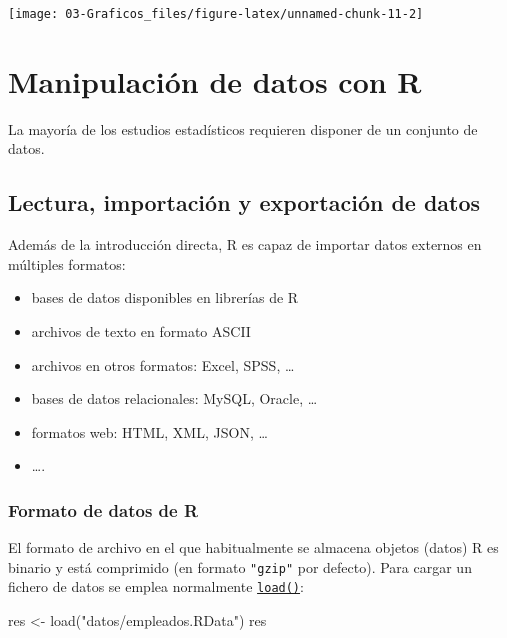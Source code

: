 \documentclass[
]{book}
\newenvironment{Shaded}{\begin{snugshade}}{\end{snugshade}}
\newcommand{\FunctionTok}[1]{\textcolor[rgb]{0.00,0.00,0.00}{#1}}
\newcommand{\NormalTok}[1]{#1}
\newcommand{\OtherTok}[1]{\textcolor[rgb]{0.56,0.35,0.01}{#1}}
\newcommand{\StringTok}[1]{\textcolor[rgb]{0.31,0.60,0.02}{#1}}
\theoremstyle{break}
\theoremstyle{nonumberplain}
\begin{document}
\begin{center}\texttt{[image: 03-Graficos\_files/figure-latex/unnamed-chunk-11-2]} \end{center}

\hypertarget{manipulaciuxf3n-de-datos-con-r}{%
\chapter{Manipulación de datos con R}\label{manipulaciuxf3n-de-datos-con-r}}

La mayoría de los estudios estadísticos
requieren disponer de un conjunto de datos.

\hypertarget{lectura-importaciuxf3n-y-exportaciuxf3n-de-datos}{%
\section{Lectura, importación y exportación de datos}\label{lectura-importaciuxf3n-y-exportaciuxf3n-de-datos}}

Además de la introducción directa, R es capaz de
importar datos externos en múltiples formatos:

\begin{itemize}
\item
  bases de datos disponibles en librerías de R
\item
  archivos de texto en formato ASCII
\item
  archivos en otros formatos: Excel, SPSS, \ldots{}
\item
  bases de datos relacionales: MySQL, Oracle, \ldots{}
\item
  formatos web: HTML, XML, JSON, \ldots{}
\item
  \ldots.
\end{itemize}

\hypertarget{formato-de-datos-de-r}{%
\subsection{Formato de datos de R}\label{formato-de-datos-de-r}}

El formato de archivo en el que habitualmente se almacena objetos (datos)
R es binario y está comprimido (en formato \texttt{"gzip"} por defecto).
Para cargar un fichero de datos se emplea normalmente \href{https://www.rdocumentation.org/packages/base/versions/3.6.1/topics/load}{\texttt{load()}}:

\begin{Shaded}
\begin{Highlighting}[]
\NormalTok{res }\OtherTok{\textless{}{-}} \FunctionTok{load}\NormalTok{(}\StringTok{"datos/empleados.RData"}\NormalTok{)}
\NormalTok{res}
\end{Highlighting}
\end{Shaded}
\end{document}
